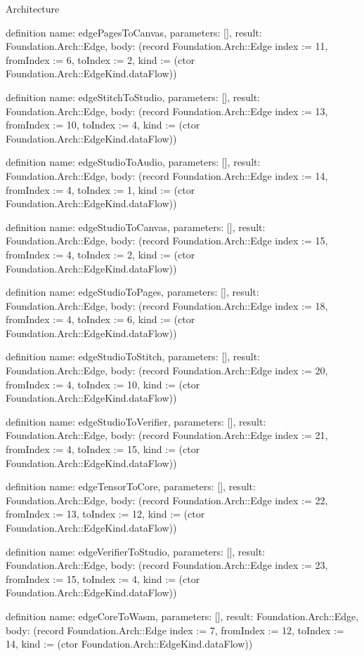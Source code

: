 \begin{lexlean}{Architecture}
\begin{semanticmodule}
definition{
  name: edgePagesToCanvas,
  parameters: [],
  result: Foundation.Arch::Edge,
  body: (record Foundation.Arch::Edge {index := 11, fromIndex := 6, toIndex := 2, kind := (ctor Foundation.Arch::EdgeKind.dataFlow)})
}

definition{
  name: edgeStitchToStudio,
  parameters: [],
  result: Foundation.Arch::Edge,
  body: (record Foundation.Arch::Edge {index := 13, fromIndex := 10, toIndex := 4, kind := (ctor Foundation.Arch::EdgeKind.dataFlow)})
}

definition{
  name: edgeStudioToAudio,
  parameters: [],
  result: Foundation.Arch::Edge,
  body: (record Foundation.Arch::Edge {index := 14, fromIndex := 4, toIndex := 1, kind := (ctor Foundation.Arch::EdgeKind.dataFlow)})
}

definition{
  name: edgeStudioToCanvas,
  parameters: [],
  result: Foundation.Arch::Edge,
  body: (record Foundation.Arch::Edge {index := 15, fromIndex := 4, toIndex := 2, kind := (ctor Foundation.Arch::EdgeKind.dataFlow)})
}

definition{
  name: edgeStudioToPages,
  parameters: [],
  result: Foundation.Arch::Edge,
  body: (record Foundation.Arch::Edge {index := 18, fromIndex := 4, toIndex := 6, kind := (ctor Foundation.Arch::EdgeKind.dataFlow)})
}

definition{
  name: edgeStudioToStitch,
  parameters: [],
  result: Foundation.Arch::Edge,
  body: (record Foundation.Arch::Edge {index := 20, fromIndex := 4, toIndex := 10, kind := (ctor Foundation.Arch::EdgeKind.dataFlow)})
}

definition{
  name: edgeStudioToVerifier,
  parameters: [],
  result: Foundation.Arch::Edge,
  body: (record Foundation.Arch::Edge {index := 21, fromIndex := 4, toIndex := 15, kind := (ctor Foundation.Arch::EdgeKind.dataFlow)})
}

definition{
  name: edgeTensorToCore,
  parameters: [],
  result: Foundation.Arch::Edge,
  body: (record Foundation.Arch::Edge {index := 22, fromIndex := 13, toIndex := 12, kind := (ctor Foundation.Arch::EdgeKind.dataFlow)})
}

definition{
  name: edgeVerifierToStudio,
  parameters: [],
  result: Foundation.Arch::Edge,
  body: (record Foundation.Arch::Edge {index := 23, fromIndex := 15, toIndex := 4, kind := (ctor Foundation.Arch::EdgeKind.dataFlow)})
}

definition{
  name: edgeCoreToWasm,
  parameters: [],
  result: Foundation.Arch::Edge,
  body: (record Foundation.Arch::Edge {index := 7, fromIndex := 12, toIndex := 14, kind := (ctor Foundation.Arch::EdgeKind.dataFlow)})
}


\end{semanticmodule}
\end{lexlean}
